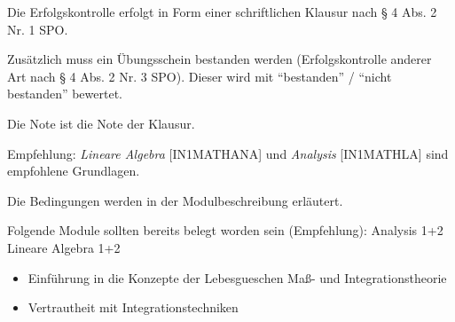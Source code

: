 \begin{course}

\setdoclanguagegerman
{}



\coursehead


\label{cour_7269.dp_997}


\begin{styleenv}
\begin{assessment}
Die Erfolgskontrolle erfolgt in Form einer schriftlichen Klausur nach § 4 Abs. 2 Nr. 1 SPO.

 

Zusätzlich muss ein Übungsschein bestanden werden (Erfolgskontrolle anderer Art nach § 4 Abs. 2 Nr. 3 SPO). Dieser wird mit “bestanden” / “nicht bestanden” bewertet.

 

Die Note ist die Note der Klausur.


\end{assessment}

\begin{conditions}Empfehlung: \emph{Lineare Algebra} [IN1MATHANA] und \emph{Analysis} [IN1MATHLA] sind empfohlene Grundlagen.

Die Bedingungen werden in der Modulbeschreibung erläutert.

\end{conditions}

\begin{recommendations}Folgende Module sollten bereits belegt worden sein (Empfehlung):\newline
Analysis 1+2\newline
Lineare Algebra 1+2

\end{recommendations}
\end{styleenv}

\begin{learningoutcomes}
\begin{itemize}\item Einführung in die Konzepte der Lebesgueschen Maß- und Integrationstheorie  \item Vertrautheit mit Integrationstechniken  \end{itemize}
\end{learningoutcomes}


\end{course}
